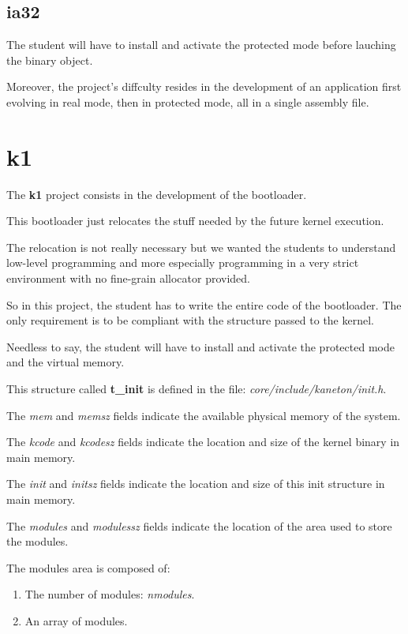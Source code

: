 %
%

\subsection{ia32}

The student will have to install and activate the protected mode before
lauching the binary object.

Moreover, the project's diffculty resides in the development of an
application first evolving in real mode, then in protected mode, all
in a single assembly file.

%
%

\section{k1}

The \textbf{k1} project consists in the development of the bootloader.

This bootloader just relocates the stuff needed by the future kernel
execution.

The relocation is not really necessary but we wanted the students
to understand low-level programming and more especially programming
in a very strict environment with no fine-grain allocator provided.

So in this project, the student has to write the entire code of the
bootloader. The only requirement is to be compliant with the structure
passed to the kernel.

Needless to say, the student will have to install and activate
the protected mode and the virtual memory.

This structure called \textbf{t\_init} is defined in the
file: \textit{core/include/kaneton/init.h}.

The \textit{mem} and \textit{memsz} fields indicate the available physical
memory of the system.

The \textit{kcode} and \textit{kcodesz} fields indicate the location and
size of the kernel binary in main memory.

The \textit{init} and \textit{initsz} fields indicate the location and
size of this init structure in main memory.

The \textit{modules} and \textit{modulessz} fields indicate the
location of the area used to store the modules.

The modules area is composed of:

\begin{enumerate}
  \item
    The number of modules: \textit{nmodules}.
  \item
    An array of modules.
\end{enumerate}

